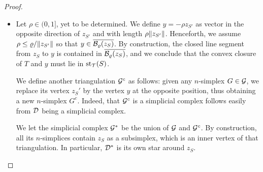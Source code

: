\documentclass[10pt,a4paper]{article}
\begin{document}
\begin{proof}
\begin{itemize}
        \item 
        Let $\rho \in (0,1]$, yet to be determined. 
        We define $y = - \rho z_{S'}$ as vector in the opposite direction of $z_{S'}$ and with length $\rho \|  z_{S'}  \|$. 
        Henceforth, we assume $\rho \leq \varrho / \|  z_{S'}  \|$ so that $y \in \overline{{\mathcal B}_{\varrho}(z_S)}$.  
        By construction, the closed line segment from $z_{S}$ to $y$ is contained in $\overline{{\mathcal B}_{\varrho}(z_S)}$,
        and we conclude that the convex closure of $T$ and $y$ must lie in $\operatorname{st}_{{\mathcal T}}(S)$.
        
        We define another triangulation ${\mathcal G}^{c}$ as follows:
        given any $n$-simplex $G \in {\mathcal G}$, 
        we replace its vertex $z_{S}'$ by the vertex $y$ at the opposite position,
        thus obtaining a new $n$-simplex $G^{c}$. 
        Indeed, that ${\mathcal G}^c$ is a simplicial complex follows easily from ${\mathcal D}$ being a simplicial complex. 
        
        We let the simplicial complex ${\mathcal G}^\ast$ be the union of ${\mathcal G}$ and ${\mathcal G}^c$. 
        By construction, all its $n$-simplices contain $z_{S}$ as a subsimplex, which is an inner vertex of that triangulation. 
        In particular, ${\mathcal D}^\ast$ is its own star around $z_{S}$.
        

\end{itemize}
\end{proof}
\end{document}

